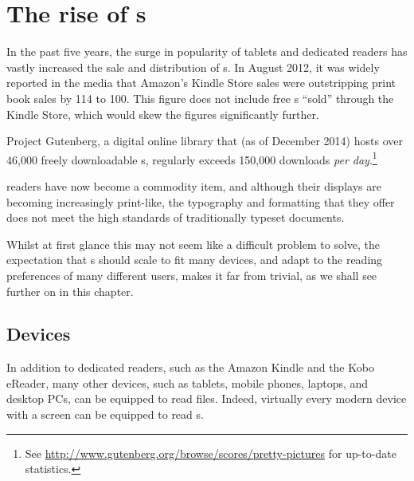 \chapter{The rise of \ebook{}s} \label{ch:intro}


In the past five years, the surge in popularity of tablets and dedicated \ebook{} readers has vastly increased the sale and distribution of \ebook{}s. In August 2012, it was widely reported in the media that Amazon's Kindle Store sales were outstripping print book sales by 114 to 100.\hspace{0pt}\cite{hexus.net2012} This figure does not include free \ebook{}s ``sold'' through the Kindle Store, which would skew the figures significantly further.

Project Gutenberg, a digital online library that (as of December 2014) hosts over 46,000 freely downloadable \ebook{}s, regularly exceeds 150,000 downloads \emph{per day}.\footnote{See \url{http://www.gutenberg.org/browse/scores/pretty-pictures} for up-to-date statistics.}

\Ebook{} readers have now become a commodity item, and although their displays are becoming increasingly print-like, the typography and formatting that they offer does not meet the high standards of traditionally typeset documents.

Whilst at first glance this may not seem like a difficult problem to solve, the expectation that \ebook{}s should scale to fit many devices, and adapt to the reading preferences of many different users, makes it far from trivial, as we shall see further on in this chapter.

\section{Devices}

In addition to dedicated \ebook{} readers, such as the Amazon Kindle and the Kobo eReader, many other devices, such as tablets, mobile phones, laptops, and desktop PCs, can be equipped to read \ebook{} files. Indeed, virtually every modern device with a screen can be equipped to read \ebook{}s.

